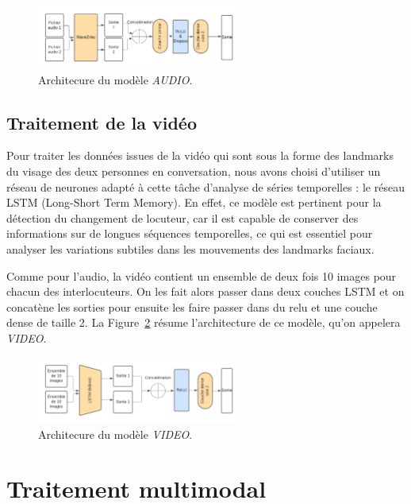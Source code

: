\documentclass[a4paper]{article}
\begin{document}
\begin{figure}[H]
    \centering
    \includegraphics[width=0.6\textwidth]{model_audio.png}
    \caption{Architecure du modèle \textit{AUDIO}.}
    \label{fig: model_audio}
\end{figure}

\subsection{Traitement de la vidéo}

Pour traiter les données issues de la vidéo qui sont sous la forme des landmarks du visage des deux personnes en conversation,
nous avons choisi d'utiliser un réseau de neurones adapté à cette tâche d'analyse de séries temporelles : le réseau LSTM (Long-Short
Term Memory). En effet, ce modèle est pertinent pour la détection du changement de locuteur, car il est capable de conserver des
informations sur de longues séquences temporelles, ce qui est essentiel pour analyser les variations subtiles dans les mouvements
des landmarks faciaux. 

Comme pour l'audio, la vidéo contient un ensemble de deux fois 10 images pour chacun des interlocuteurs. On les fait alors passer
dans deux couches LSTM et on concatène les sorties pour ensuite les faire passer dans du relu et une couche dense de taille 2.
La Figure~\ref{fig: model_video} résume l'architecture de ce modèle, qu'on appelera \textit{VIDEO}.

\begin{figure}[H]
    \centering
    \includegraphics[width=0.6\textwidth]{model_video.png}
    \caption{Architecure du modèle \textit{VIDEO}.}
    \label{fig: model_video}
\end{figure}

\section{Traitement multimodal}
\end{document}
